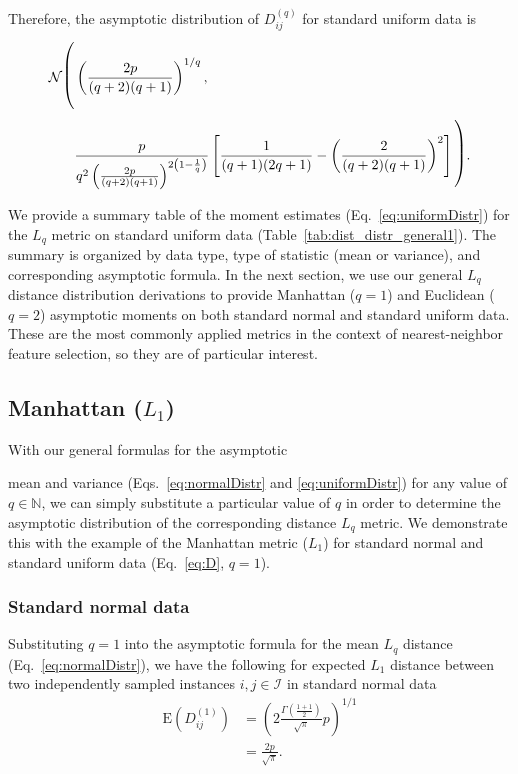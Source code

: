\documentclass[aos]{imsart}
\begin{document}
Therefore, the asymptotic distribution of $D^{(q)}_{ij}$ for standard uniform data is
%
\begin{equation}\label{eq:uniformDistr}
\begin{split}
\mathcal{N}{\text{\LARGE $\Biggl($}}& \left(\frac{2p}{(q + 2)(q + 1)}\right)^{1/q}, \\
& \frac{p}{q^2\left(\frac{2p}{(q + 2)(q + 1)}\right)^{2\left(1 - \frac{1}{q}\right)}}\left[\frac{1}{(q + 1)(2q + 1)} - \left(\frac{2}{(q + 2)(q + 1)}\right)^2\right]{\text{\LARGE $\Biggr)$}}.
\end{split}
\end{equation}

We provide a summary table of the moment estimates (Eq.~\ref{eq:uniformDistr}) for the $L_q$ metric on standard uniform data (Table~\ref{tab:dist_distr_general1}). The summary is organized by data type, type of statistic (mean or variance), and corresponding asymptotic formula. In the next section, we use our general $L_q$ distance distribution derivations to provide Manhattan ($q=1$) and Euclidean ($q=2$) asymptotic moments on both standard normal and standard uniform data. These are the most commonly applied metrics in the context of nearest-neighbor feature selection, so they are of particular interest.

\subsection{Manhattan \texorpdfstring{($L_1$)}{}}

With our general formulas for the asymptotic 

\noindent mean and variance (Eqs.~\ref{eq:normalDistr} and \ref{eq:uniformDistr}) for any value of $q \in \mathbb{N}$, we can simply substitute a particular value of $q$ in order to determine the asymptotic distribution of the corresponding distance $L_q$ metric. We demonstrate this with the example of the Manhattan metric ($L_1$) for standard normal and standard uniform data (Eq.~\ref{eq:D}, $q=1$).

\subsubsection{Standard normal data}

Substituting $q=1$ into the asymptotic formula for the mean $L_q$ distance (Eq.~\ref{eq:normalDistr}), we have the following for expected $L_1$ distance between two independently sampled instances $i,j \in \mathcal{I}$ in standard normal data
%
\begin{equation}\label{eq:normalManMean}
\begin{aligned}
\text{E}\left(D^{(1)}_{ij}\right) &= \left(2\frac{\Gamma\left(\frac{1 + 1}{2}\right)}{\sqrt{\pi}}p\right)^{1/1} \\
&= \frac{2p}{\sqrt{\pi}}.
\end{aligned}
\end{equation}
\end{document}
